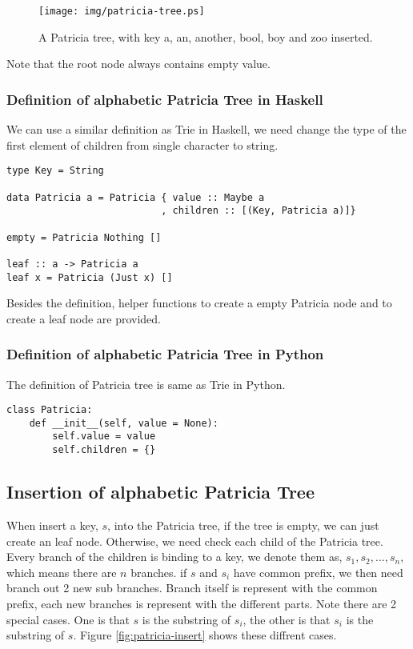 \documentclass{article}
\begin{document}
\begin{figure}[htbp]
  \begin{center}
    \texttt{[image: img/patricia-tree.ps]}
      \caption{A Patricia tree, with key a, an, another, bool,
    boy and zoo inserted.}
      \label{fig:patricia-tree}
  \end{center}
\end{figure}

Note that the root node always contains empty value.

\subsubsection*{Definition of alphabetic Patricia Tree in Haskell}
We can use a similar definition as Trie in Haskell, we need change
the type of the first element of children from single character to
string.

\lstset{language=Haskell}
\begin{lstlisting}
type Key = String

data Patricia a = Patricia { value :: Maybe a
                           , children :: [(Key, Patricia a)]}

empty = Patricia Nothing []

leaf :: a -> Patricia a
leaf x = Patricia (Just x) []
\end{lstlisting}

Besides the definition, helper functions to create a empty
Patricia node and to create a leaf node are provided.

\subsubsection*{Definition of alphabetic Patricia Tree in Python}
The definition of Patricia tree is same as Trie in Python.

\lstset{language=Python}
\begin{lstlisting}
class Patricia:
    def __init__(self, value = None):
        self.value = value
        self.children = {}
\end{lstlisting}

\subsection{Insertion of alphabetic Patricia Tree}
When insert a key, $s$, into the Patricia tree, if the tree is empty, we
can just create an leaf node. Otherwise, we need check each child of the
Patricia tree. Every branch of the children is binding to a key, we denote
them as, $s_1, s_2, ..., s_n$, which means there are $n$ branches.
if $s$ and $s_i$ have common prefix, we then need branch out 2 new sub
branches. Branch itself is represent with the common prefix, each new
branches is represent with the different parts. Note there are 2 special
cases. One is that $s$ is the substring of $s_i$, the other is that $s_i$
is the substring of $s$. Figure \ref{fig:patricia-insert} shows these
diffrent cases.
\end{document}
